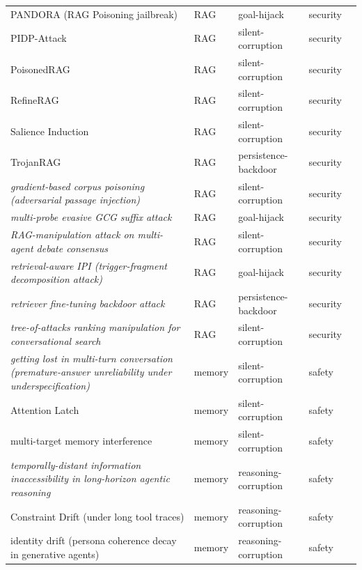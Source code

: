 \begin{longtable}{@{}>{\raggedright\arraybackslash}p{}llll@{}}
PANDORA (RAG Poisoning jailbreak) & RAG & goal-hijack & security & \cite{deng-2024-pandora} \\
PIDP-Attack & RAG & silent-corruption & security & \cite{wang-2026-pidpattack} \\
PoisonedRAG & RAG & silent-corruption & security & \cite{zou-2024-poisonedrag} \\
RefineRAG & RAG & silent-corruption & security & \cite{wang-2026-refinerag} \\
Salience Induction & RAG & silent-corruption & security & \cite{zhou-2026-salience} \\
TrojanRAG & RAG & persistence-backdoor & security & \cite{cheng-2024-trojanrag} \\
\emph{gradient-based corpus poisoning (adversarial passage injection)} & RAG & silent-corruption & security & \cite{zhong-2023-poisoning} \\
\emph{multi-probe evasive GCG suffix attack} & RAG & goal-hijack & security & \cite{rahman-2026-bypassing} \\
\emph{RAG-manipulation attack on multi-agent debate consensus} & RAG & silent-corruption & security & \cite{kraidia-2026-raginduced} \\
\emph{retrieval-aware IPI (trigger-fragment decomposition attack)} & RAG & goal-hijack & security & \cite{chang-2026-overcoming} \\
\emph{retriever fine-tuning backdoor attack} & RAG & persistence-backdoor & security & \cite{clop-2024-backdoored} \\
\emph{tree-of-attacks ranking manipulation for conversational search} & RAG & silent-corruption & security & \cite{pfrommer-2024-ranking} \\
\emph{getting lost in multi-turn conversation (premature-answer unreliability under underspecification)} & memory & silent-corruption & safety & \cite{laban-2025-llms} \\
Attention Latch & memory & silent-corruption & safety & \cite{shehata-2026-attention} \\
multi-target memory interference & memory & silent-corruption & safety & \cite{lee-2026-minteval} \\
\emph{temporally-distant information inaccessibility in long-horizon agentic reasoning} & memory & reasoning-corruption & safety & \cite{hu-2026-sam} \\
Constraint Drift (under long tool traces) & memory & reasoning-corruption & safety & \cite{bui-2026-himaptravel} \\
identity drift (persona coherence decay in generative agents) & memory & reasoning-corruption & safety & \cite{platnick-2025-idrag} \\

\end{longtable}
